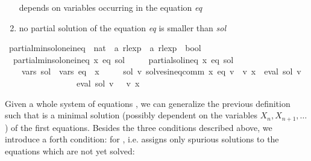 \begin{isabellebody}
\begin{isamarkuptext}
\begin{enumerate}
  depends on variables occurring in the equation \textit{eq}
\item no partial solution of the equation \textit{eq} is smaller than \textit{sol}
\end{enumerate}%
\end{isamarkuptext}\isamarkuptrue%
\isamarkupfalse%
\ partial{\isacharunderscore}{\kern0pt}min{\isacharunderscore}{\kern0pt}sol{\isacharunderscore}{\kern0pt}one{\isacharunderscore}{\kern0pt}ineq\ {\isacharcolon}{\kern0pt}{\isacharcolon}{\kern0pt}\ {\isachardoublequoteopen}nat\ {\isasymRightarrow}\ {\isacharprime}{\kern0pt}a\ rlexp\ {\isasymRightarrow}\ {\isacharprime}{\kern0pt}a\ rlexp\ {\isasymRightarrow}\ bool{\isachardoublequoteclose}\ \isanewline
\ \ {\isachardoublequoteopen}partial{\isacharunderscore}{\kern0pt}min{\isacharunderscore}{\kern0pt}sol{\isacharunderscore}{\kern0pt}one{\isacharunderscore}{\kern0pt}ineq\ x\ eq\ sol\ {\isasymequiv}\isanewline
\ \ \ \ partial{\isacharunderscore}{\kern0pt}sol{\isacharunderscore}{\kern0pt}ineq\ x\ eq\ sol\ {\isasymand}\isanewline
\ \ \ \ vars\ sol\ {\isasymsubseteq}\ vars\ eq\ {\isacharminus}{\kern0pt}\ {\isacharbraceleft}{\kern0pt}x{\isacharbraceright}{\kern0pt}\ {\isasymand}\isanewline
\ \ \ \ {\isacharparenleft}{\kern0pt}{\isasymforall}sol{\isacharprime}{\kern0pt}\ v{\isacharprime}{\kern0pt}{\isachardot}{\kern0pt}\ solves{\isacharunderscore}{\kern0pt}ineq{\isacharunderscore}{\kern0pt}comm\ x\ eq\ v{\isacharprime}{\kern0pt}\ {\isasymand}\ v{\isacharprime}{\kern0pt}\ x\ {\isacharequal}{\kern0pt}\ eval\ sol{\isacharprime}{\kern0pt}\ v{\isacharprime}{\kern0pt}\isanewline
\ \ \ \ \ \ \ \ \ \ \ \ \ \ \ {\isasymlongrightarrow}\ {\isasymPsi}\ {\isacharparenleft}{\kern0pt}eval\ sol\ v{\isacharprime}{\kern0pt}{\isacharparenright}{\kern0pt}\ {\isasymsubseteq}\ {\isasymPsi}\ {\isacharparenleft}{\kern0pt}v{\isacharprime}{\kern0pt}\ x{\isacharparenright}{\kern0pt}{\isacharparenright}{\kern0pt}{\isachardoublequoteclose}%
\begin{isamarkuptext}%
Given a whole system of equations , we can generalize the previous definition such that
 is a minimal solution (possibly dependent on the variables $X_n, X_{n+1}, \dots$) of
the first  equations. Besides the three conditions described above, we introduce a forth
condition:  for , i.e.  assigns only spurious solutions to the
equations which are not yet solved:%
\end{isamarkuptext}\isamarkuptrue%

\end{isabellebody}
